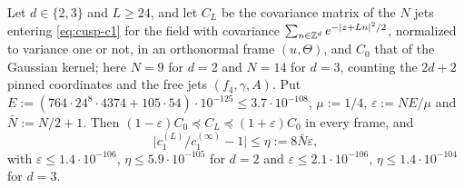 \begin{lemma}\label{lem:cusp-transfer}
Let $d\in\{2,3\}$ and $L\ge24$, and let $C_L$ be the covariance matrix of the $N$ jets entering \eqref{eq:cusp-c1} for the field with covariance $\sum_{n\in\mathbb Z^d}e^{-|z+Ln|^2/2}$, normalized to variance one or not, in an orthonormal frame $(u,\Theta)$, and $C_0$ that of the Gaussian kernel; here $N=9$ for $d=2$ and $N=14$ for $d=3$, counting the $2d+2$ pinned coordinates and the free jets $(f_4,\gamma,A)$. Put $E:=(764\cdot24^8\cdot4374+105\cdot54)\cdot10^{-125}\le3.7\cdot10^{-108}$, $\mu:=1/4$, $\varepsilon:=NE/\mu$ and $\bar N:=N/2+1$. Then $(1-\varepsilon)C_0\preceq C_L\preceq(1+\varepsilon)C_0$ in every frame, and
\[
\bigl|c_1^{(L)}/c_1^{(\infty)}-1\bigr|\le\eta:=8\bar N\varepsilon,
\]
with $\varepsilon\le1.4\cdot10^{-106}$, $\eta\le5.9\cdot10^{-105}$ for $d=2$ and $\varepsilon\le2.1\cdot10^{-106}$, $\eta\le1.4\cdot10^{-104}$ for $d=3$.
\end{lemma}

